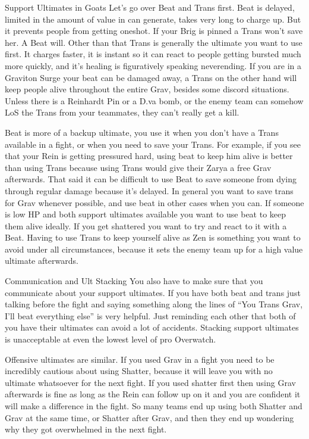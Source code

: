 Support Ultimates in Goats
Let’s go over Beat and Trans first. Beat is delayed, limited in the amount of value in can generate, takes very long to charge up. But it prevents people from getting oneshot. If your Brig is pinned a Trans won’t save her. A Beat will. Other than that Trans is generally the ultimate you want to use first. It charges faster, it is instant so it can react to people getting bursted much more quickly, and it’s healing is figuratively speaking neverending. If you are in a Graviton Surge your beat can be damaged away, a Trans on the other hand will keep people alive throughout the entire Grav, besides some discord situations. Unless there is a Reinhardt Pin or a D.va bomb, or the enemy team can somehow LoS the Trans from your teammates, they can’t really get a kill.

Beat is more of a backup ultimate, you use it when you don’t have a Trans available in a fight, or when you need to save your Trans. For example, if you see that your Rein is getting pressured hard, using beat to keep him alive is better than using Trans because using Trans would give their Zarya a free Grav afterwards.
That said it can be difficult to use Beat to save someone from dying through regular damage because it’s delayed. In general you want to save trans for Grav whenever possible, and use beat in other cases when you can. If someone is low HP and both support ultimates available you want to use beat to keep them alive ideally. If you get shattered you want to try and react to it with a Beat. Having to use Trans to keep yourself alive as Zen is something you want to avoid under all circumstances, because it sets the enemy team up for a high value ultimate afterwards.

Communication and Ult Stacking
You also have to make sure that you communicate about your support ultimates. If you have both beat and trans just talking before the fight and saying something along the lines of “You Trans Grav, I’ll beat everything else” is very helpful. Just reminding each other that both of you have their ultimates can avoid a lot of accidents. Stacking support ultimates is unacceptable at even the lowest level of pro Overwatch.

Offensive ultimates are similar. If you used Grav in a fight you need to be incredibly cautious about using Shatter, because it will leave you with no ultimate whatsoever for the next fight. If you used shatter first then using Grav afterwards is fine as long as the Rein can follow up on it and you are confident it will make a difference in the fight. So many teams end up using both Shatter and Grav at the same time, or Shatter after Grav, and then they end up wondering why they got overwhelmed in the next fight.

